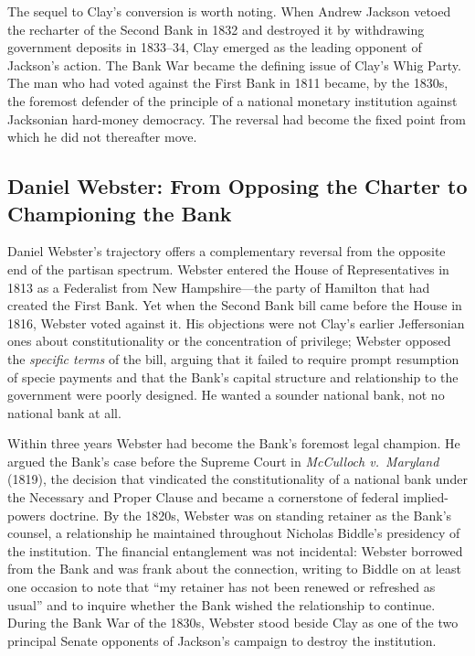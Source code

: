 \documentclass[12pt]{article}
\begin{document}
The sequel to Clay's conversion is worth noting.  When Andrew Jackson
vetoed the recharter of the Second Bank in 1832 and destroyed it by
withdrawing government deposits in 1833--34, Clay emerged as the leading
opponent of Jackson's action.  The Bank War became the defining issue
of Clay's Whig Party.  The man who had voted against the First Bank in
1811 became, by the 1830s, the foremost defender of the principle of a
national monetary institution against Jacksonian hard-money democracy.
The reversal had become the fixed point from which he did not thereafter
move.

\subsection{Daniel Webster: From Opposing the Charter to Championing
             the Bank}

Daniel Webster's trajectory offers a complementary reversal from the
opposite end of the partisan spectrum.  Webster entered the House of
Representatives in 1813 as a Federalist from New Hampshire---the party
of Hamilton that had created the First Bank.  Yet when the Second Bank
bill came before the House in 1816, Webster voted against it.  His
objections were not Clay's earlier Jeffersonian ones about
constitutionality or the concentration of privilege; Webster opposed the
\emph{specific terms} of the bill, arguing that it failed to require
prompt resumption of specie payments and that the Bank's capital
structure and relationship to the government were poorly designed.  He
wanted a sounder national bank, not no national bank at all.

Within three years Webster had become the Bank's foremost legal
champion.  He argued the Bank's case before the Supreme Court in
\textit{McCulloch v.~Maryland} (1819), the decision that vindicated
the constitutionality of a national bank under the Necessary and Proper
Clause and became a cornerstone of federal implied-powers doctrine.
By the 1820s, Webster was on standing retainer as the Bank's counsel, a
relationship he maintained throughout Nicholas Biddle's presidency of
the institution.  The financial entanglement was not incidental: Webster
borrowed from the Bank and was frank about the connection, writing to
Biddle on at least one occasion to note that ``my retainer has not been
renewed or refreshed as usual'' and to inquire whether the Bank wished
the relationship to continue.  During the Bank War of the 1830s, Webster
stood beside Clay as one of the two principal Senate opponents of
Jackson's campaign to destroy the institution.
\end{document}
